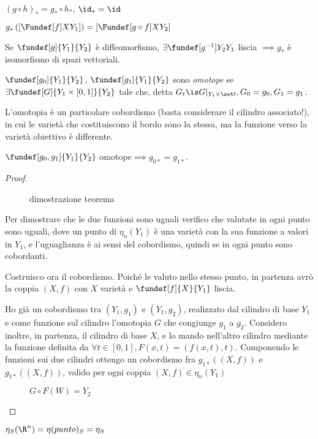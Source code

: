 

\begin{oss}
 $(g\circ h )_* = g_*\circ h_*$,
 $\id_* = \id$
\end{oss}
$g_*\left(\left[\Fundef[f]X{Y_1} \right]\right) = \left[\Fundef[g\circ f]X {Y_2} \right]$
\begin{oss}
 Se $\fundef[g]{Y_1}{Y_2}$ è diffeomorfismo, $\exists \fundef[g^{-1}]{Y_2}{Y_1}$ liscia $\implies g_*$ è isomorfismo di spazi vettoriali.
\end{oss}
\begin{defn}[Omotopia]
 $\fundef[g_0]{Y_1}{Y_2}$, $\fundef[g_1]{Y_1}{Y_2}$ sono \emph{omotope} se $\exists \fundef[G]{Y_1\times\left[ 0,1\right]}{Y_2}$ tale che,
 detta $G_t\is  G|_{Y_1\times \set t}, G_0=g_0, G_1=g_1$.
\end{defn}
 \begin{oss}
  L'omotopia è un particolare cobordismo (basta considerare il cilindro associato!), in cui le varietà che costituiscono il bordo sono la stessa, ma la funzione verso la varietà obiettivo è differente.
 \end{oss}
\begin{prop}
 $\fundef[g_0, g_1]{Y_1}{Y_2}$ omotope$\implies g_{0*}=g_{1*}$.
\end{prop}
\begin{proof}
 \begin{figure}
  \centering
  
  \caption{dimostrazione teorema}
 \end{figure}
 Per dimostrare che le due funzioni sono uguali verifico che valutate in ogni punto sono uguali, dove un punto di $\eta_n(Y_1)$ è una varietà con la sua funzione a valori in $Y_1$, e l'uguaglianza è ai sensi del cobordismo, quindi se in ogni punto sono cobordanti.

 Costruisco ora il cobordismo. Poiché le valuto nello stesso punto, in partenza avrò la coppia $(X,f)$ con $X$ varietà e $\fundef[f]{X}{Y_1}$ liscia.

 Ho già un cobordismo tra $(Y_1, g_1)$ e $(Y_1, g_2)$, realizzato dal cilindro di base $Y_1$ e come funzione sul cilindro l'omotopia $G$ che congiunge $g_1$ a $g_2$. Considero inoltre, in partenza, il cilindro di base $X$, e lo mando nell'altro cilindro mediante la funzione definita da $\forall t\in \left[ 0,1\right], F(x,t)=(f(x,t), t)$. Componendo le funzioni sui due cilindri ottengo un cobordismo fra $g_{1*}((X,f))$ e $g_{1*}((X,f))$, valido per ogni coppia $(X,f) \in \eta_n(Y_1)$
  \begin{figure}
  \centering
  
  \caption{$G\circ F (W) = Y_2$}
 \end{figure}
\end{proof}
\begin{oss}
 $\eta_S (\R ^n) = \eta (punto)_S = \eta_S $
\end{oss}


